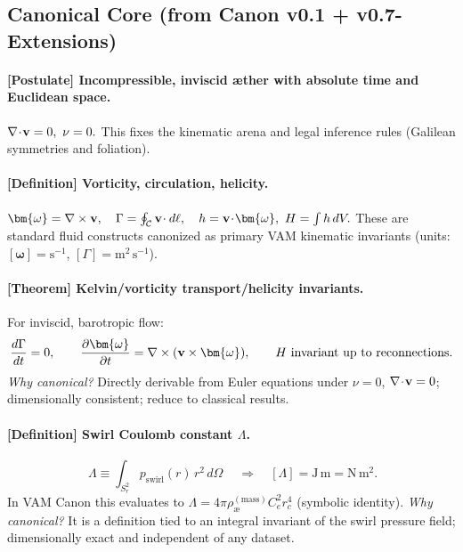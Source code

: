 \documentclass[11pt, a4paper]{article}
\begin{document}
    \subsection*{Canonical Core (from Canon v0.1 + v0.7-Extensions)}
    \paragraph{[Postulate] Incompressible, inviscid æther with absolute time and Euclidean space.}
    \(\nabla\!\cdot\!\vb v=0,\ \nu=0.\)
    This fixes the kinematic arena and legal inference rules (Galilean symmetries and foliation).

    \paragraph{[Definition] Vorticity, circulation, helicity.}
    \(\bm{\omega}=\nabla\times \vb v,\quad \Gamma=\oint_{\mathcal{C}} \vb v\!\cdot d\vb \ell,\quad h=\vb v\!\cdot\!\bm{\omega},\ H=\int h\,dV.\)
    These are standard fluid constructs canonized as primary VAM kinematic invariants (units: \([\bm{\omega}]=\mathrm{s}^{-1}\), \([\Gamma]=\mathrm{m^2\,s^{-1}}\)). \cite{Helmholtz1858,Kelvin1869,Moffatt1969,Batchelor1967,LandauLifshitz1987}

    \paragraph{[Theorem] Kelvin/vorticity transport/helicity invariants.}
    For inviscid, barotropic flow:
    \[
        \frac{d\Gamma}{dt}=0,\qquad
        \pdv{\bm{\omega}}{t}=\nabla\times(\vb v\times\bm{\omega}),\qquad
        \text{$H$ invariant up to reconnections}.
    \]
    \emph{Why canonical?} Directly derivable from Euler equations under \(\nu=0\), \(\nabla\!\cdot\!\vb v=0\); dimensionally consistent; reduce to classical results. \cite{Helmholtz1858,Kelvin1869,Moffatt1969}

    \paragraph{[Definition] Swirl Coulomb constant \(\Lambda\).}
    \[
        \boxed{\ \Lambda \equiv \int_{S_r^2} p_{\text{swirl}}(r)\, r^2\, d\Omega\ } \quad\Rightarrow\quad [\Lambda]=\mathrm{J\,m}=\mathrm{N\,m^2}.
    \]
    In VAM Canon this evaluates to \( \Lambda=4\pi \rho_{\text{\ae}}^{(\text{mass})} C_e^2 r_c^4\) (symbolic identity).
    \emph{Why canonical?} It is a definition tied to an integral invariant of the swirl pressure field; dimensionally exact and independent of any dataset.
\end{document}
